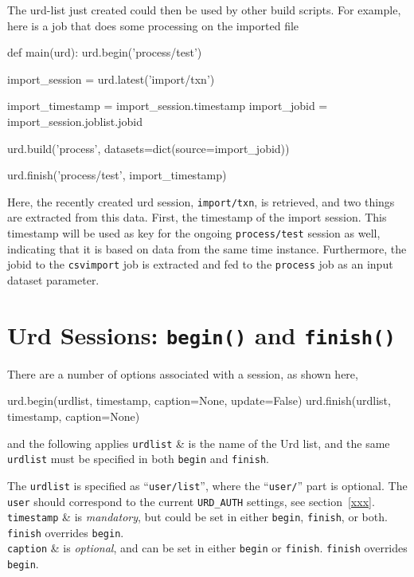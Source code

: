 The urd-list just created could then be used by other build scripts.
For example, here is a job that does some processing on the imported
file
\begin{python}
def main(urd):
    urd.begin('process/test')

    import_session = urd.latest('import/txn')

    import_timestamp = import_session.timestamp
    import_jobid     = import_session.joblist.jobid

    urd.build('process', datasets=dict(source=import_jobid))

    urd.finish('process/test', import_timestamp)
\end{python}
Here, the recently created urd session, \texttt{import/txn}, is
retrieved, and two things are extracted from this data.  First, the
timestamp of the import session.  This timestamp will be used as key
for the ongoing \texttt{process/test} session as well, indicating that
it is based on data from the same time instance.  Furthermore, the
jobid to the \texttt{csvimport} job is extracted and fed to
the \texttt{process} job as an input dataset parameter.



\section{Urd Sessions:  \texttt{begin()} and \texttt{finish()}}

There are a number of options associated with a session, as shown
here,
\begin{python}
urd.begin(urdlist, timestamp, caption=None, update=False)
urd.finish(urdlist, timestamp, caption=None)
\end{python}
and the following applies
\starttabletwo
\RPtwo \texttt{urdlist} & is the name of the Urd list, and the same
  \texttt{urdlist} must be specified in both \texttt{begin}
  and \texttt{finish}.

  The \texttt{urdlist} is specified as
  ``\texttt{user/list}'', where the ``\texttt{user/}'' part is
  optional.  The \texttt{user} should correspond to the
  current \texttt{URD\_AUTH} settings, see section~\ref{xxx}.\\[2ex]

\RPtwo \texttt{timestamp} & is \textsl{mandatory}, but could be set in either
  \texttt{begin}, \texttt{finish}, or both.  \texttt{finish}
  overrides \texttt{begin}.\\[2ex]

\RPtwo \texttt{caption} & is \textsl{optional}, and can be set in either
  \texttt{begin} or \texttt{finish}.  \texttt{finish}
  overrides \texttt{begin}.\\[2ex]


